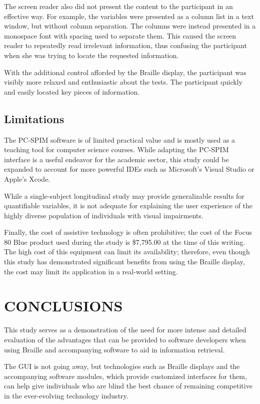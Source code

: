 \documentclass[11.5pt]{sig-alternate} %
\begin{document}
\begin{large}
The screen reader also did not present the content to the participant in an effective way. For example, the variables were presented as a column list in a text window, but without column separation. The columns were instead presented in a monospace font with spacing used to separate them. This caused the screen reader to repeatedly read irrelevant information, thus confusing the participant when she was trying to locate the requested information.

With the additional control afforded by the Braille display, the participant was visibly more relaxed and enthusiastic about the tests. The participant quickly and easily located key pieces of information.

\subsection*{Limitations}

The PC-SPIM software is of limited practical value and is mostly used as a teaching tool for computer science courses. While adapting the PC-SPIM interface is a useful endeavor for the academic sector, this study could be expanded to account for more powerful IDEs such as Microsoft’s Visual Studio or Apple’s Xcode.

While a single-subject longitudinal study may provide generalizable results for quantifiable variables, it is not adequate for explaining the user experience of the highly diverse population of individuals with visual impairments. 

Finally, the cost of assistive technology is often prohibitive; the cost of the Focus 80 Blue product used during the study is \$7,795.00 at the time of this writing. The high cost of this equipment can limit its availability; therefore, even though this study has demonstrated significant benefits from using the Braille display, the cost may limit its application in a real-world setting. 

\section*{CONCLUSIONS}

This study serves as a demonstration of the need for more intense and detailed evaluation of the advantages that can be provided to software developers when using Braille and accompanying software to aid in information retrieval. 

The GUI is not going away, but technologies such as Braille displays and the accompanying software modules, which provide customized interfaces for them, can help give individuals who are blind the best chance of remaining competitive in the ever-evolving technology industry. 


\end{large}
\end{document}
